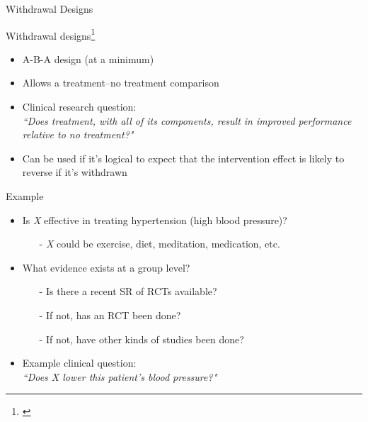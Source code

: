 \documentclass{beamer}
\begin{document}
\begin{frame}
\begin{center}
\Huge{Withdrawal Designs}
\end{center}
\end{frame}

% 
\begin{frame}{Withdrawal designs\footnote{\tiny{\citet{Kearns1986}}}}
	\begin{itemize}
	\item A-B-A design (at a minimum)
	\item Allows a treatment--no treatment comparison
	\item Clinical research question: \\
		 \emph{``Does \alert{treatment}, with all of its components, result in improved performance relative to \alert{no treatment?"}}
	\item Can be used if it's logical to expect that the intervention effect is likely to reverse if it's withdrawn
	\end{itemize}
\end{frame}

% 
\begin{frame}{Example}	
	\begin{itemize}
	\item Is \emph{X} effective in treating hypertension (high blood pressure)?
		\begin{itemize}
		\item[-] \emph{X} could be exercise, diet, meditation, medication, etc.
		\end{itemize}
	\item What evidence exists at a group level?
		\begin{itemize}
		\item[-] Is there a recent SR of RCTs available? 
		\item[-] If not, has an RCT been done?
		\item[-] If not, have other kinds of studies been done?
		\end{itemize}
	\item Example clinical question: \\ 
		\emph{``Does X lower \alert{this patient's} blood pressure?"}  
	\end{itemize}
\end{frame}
\end{document}
